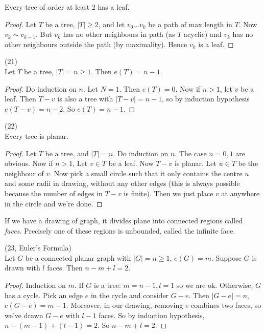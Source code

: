 \documentclass[a4paper]{article}
\begin{document}
\begin{prop}
Every tree of order at least 2 has a leaf.
\begin{proof}
Let $T$ be a tree, $|T| \geq 2$, and let $v_0...v_k$ be a path of max length in $T$. Now $v_k \sim v_{k-1}$. But $v_k$ has no other neighbours in path (as $T$ acyclic) and $v_k$ has no other neighbours outside the path (by maximality). Hence $v_k$ is a leaf.
\end{proof}
\end{prop}

\begin{prop} (21)\\
Let $T$ be a tree, $|T| = n \geq 1$. Then $e(T) = n-1$.
\begin{proof}
Do induction on $n$. Let $N=1$. Then $e(T)=0$. Now if $n >1$, let $v$ be a leaf. Then $T-v$ is also a tree with $|T-v| = n-1$, so by induction hypothesis $e(T-v) = n-2$. So $e(T) = n-1$.
\end{proof}
\end{prop}

\begin{prop} (22)\\
Every tree is planar.
\begin{proof}
Let $T$ be a tree, and $|T| = n$. Do induction on $n$. The case $n=0,1$ are obvious. Now if $n>1$, Let $v \in T$ be a leaf. Now $T-v$ is planar. Let $u \in T$ be the neighbour of $v$. Now pick a small circle such that it only contains the centre $u$ and some radii in drawing, without any other edges (this is always possible because the number of edges in $T-v$ is finite). Then we just place $v$ at anywhere in the circle and we're done.
\end{proof}
\end{prop}

If we have a drawing of graph, it divides plane into connected regions called \emph{faces}. Precisely one of these regions is unbounded, called the infinite face.	

\begin{thm} (23, Euler's Formula)\\
Let $G$ be a connected planar graph with $|G| = n \geq 1$, $e(G) = m$. Suppose $G$ is drawn with $l$ faces. Then $n-m+l = 2$.
\begin{proof}
Induction on $m$. If $G$ is a tree: $m=n-1,l=1$ so we are ok. Otherwise, $G$ has a cycle. Pick an edge $e$ in the cycle and consider $G-e$. Then $|G-e|=n$, $e(G-e) = m-1$. Moreover, in our drawing, removing $e$ combines two faces, so we've drawn $G-e$ with $l-1$ faces. So by induction hypothesis, $n-(m-1)+(l-1) = 2$. So $n-m+l = 2$.
\end{proof}
\end{thm}
\end{document}
